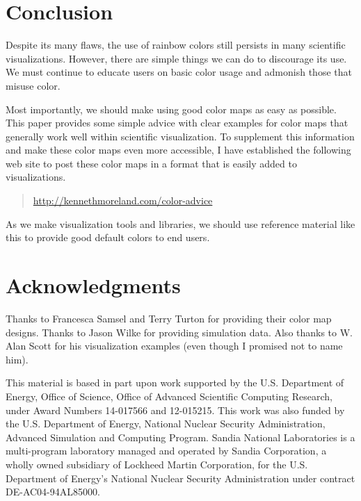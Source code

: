 \documentclass[letterpaper,twocolumn,fleqn]{article}
\newcommand{\fix}[1]{}
\begin{document}



\section{Conclusion}

\noindent
Despite its many flaws, the use of rainbow colors still persists in many
scientific visualizations. However, there are simple things we can do to
discourage its use. We must continue to educate users on basic color usage
and admonish those that misuse color.

Most importantly, we should make using good color maps as easy as possible.
This paper provides some simple advice with clear examples for color maps
that generally work well within scientific visualization. To supplement
this information and make these color maps even more accessible, I have
established the following web site to post these color maps in a format
that is easily added to visualizations.

\begin{quote}
  \url{http://kennethmoreland.com/color-advice}
\end{quote}

\fix{Actually make this web page.}

As we make visualization tools and libraries, we should use reference
material like this to provide good default colors to end users.

\section{Acknowledgments}

\noindent
Thanks to Francesca Samsel and Terry Turton for providing their color map
designs. Thanks to Jason Wilke for providing simulation data. Also thanks
to W. Alan Scott for his visualization examples (even though I promised not
to name him).

This material is based in part upon work supported by the U.S. Department
of Energy, Office of Science, Office of Advanced Scientific Computing
Research, under Award Numbers 14-017566 and 12-015215. This work was also
funded by the U.S. Department of Energy, National Nuclear Security
Administration, Advanced Simulation and Computing Program. Sandia National
Laboratories is a multi-program laboratory managed and operated by Sandia
Corporation, a wholly owned subsidiary of Lockheed Martin Corporation, for
the U.S. Department of Energy's National Nuclear Security Administration
under contract DE-AC04-94AL85000.
\end{document}

